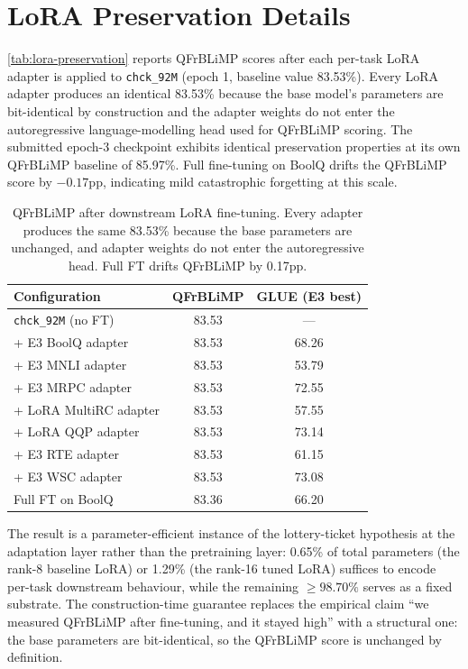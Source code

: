 \documentclass[11pt]{article}
\begin{document}
\section{LoRA Preservation Details}
\label{app:lora}

\autoref{tab:lora-preservation} reports QFrBLiMP scores after each per-task LoRA adapter is applied to \texttt{chck\_92M} (epoch 1, baseline value 83.53\%). Every LoRA adapter produces an identical 83.53\% because the base model's parameters are bit-identical by construction and the adapter weights do not enter the autoregressive language-modelling head used for QFrBLiMP scoring. The submitted epoch-3 checkpoint exhibits identical preservation properties at its own QFrBLiMP baseline of 85.97\%. Full fine-tuning on BoolQ drifts the QFrBLiMP score by $-0.17$pp, indicating mild catastrophic forgetting at this scale.

\begin{table}[h]
\centering
\begin{tabular}{lcc}
\toprule
Configuration & QFrBLiMP & GLUE (E3 best) \\
\midrule
\texttt{chck\_92M} (no FT)         & 83.53 & --- \\
+ E3 BoolQ adapter                 & 83.53 & 68.26 \\
+ E3 MNLI adapter                  & 83.53 & 53.79 \\
+ E3 MRPC adapter                  & 83.53 & 72.55 \\
+ LoRA MultiRC adapter             & 83.53 & 57.55 \\
+ LoRA QQP adapter                 & 83.53 & 73.14 \\
+ E3 RTE adapter                   & 83.53 & 61.15 \\
+ E3 WSC adapter                   & 83.53 & 73.08 \\
\midrule
Full FT on BoolQ                   & 83.36 & 66.20 \\
\bottomrule
\end{tabular}
\caption{QFrBLiMP after downstream LoRA fine-tuning. Every adapter produces the same 83.53\% because the base parameters are unchanged, and adapter weights do not enter the autoregressive head. Full FT drifts QFrBLiMP by 0.17pp.}
\label{tab:lora-preservation}
\end{table}

The result is a parameter-efficient instance of the lottery-ticket hypothesis \citep{frankle2018lottery} at the adaptation layer rather than the pretraining layer: 0.65\% of total parameters (the rank-8 baseline LoRA) or 1.29\% (the rank-16 tuned LoRA) suffices to encode per-task downstream behaviour, while the remaining $\geq\!98.70\%$ serves as a fixed substrate. The construction-time guarantee replaces the empirical claim \enquote{we measured QFrBLiMP after fine-tuning, and it stayed high} with a structural one: the base parameters are bit-identical, so the QFrBLiMP score is unchanged by definition.
\end{document}
